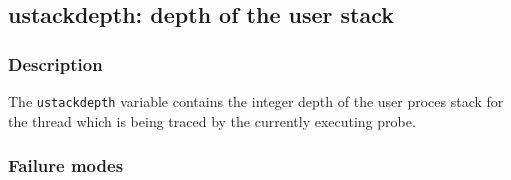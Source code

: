\clearpage
{}
{}
\label{vars:ustackdepth}
\subsection*{ustackdepth: depth of the user stack}

\subsubsection*{Description}

The \verb|ustackdepth| variable contains the integer depth of the user
proces stack for the thread which is being traced by the currently
executing probe.

\subsubsection*{Failure modes}


